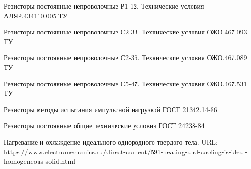 \documentclass[a4paper]{article}
\begin{document}
\begin{thebibliography}{2}
    Резисторы постоянные непроволочные Р1-12. Технические условия АЛЯР.434110.005 ТУ

    Резисторы постоянные непроволочные С2-33. Технические условия ОЖО.467.093 ТУ

    Резисторы постоянные непроволочные С2-36. Технические условия ОЖО.467.089 ТУ

    Резисторы постоянные непроволочные С5-47. Технические условия ОЖО.467.531 ТУ

    Резисторы методы испытания импульсной нагрузкой ГОСТ 21342.14-86

    Резисторы постоянные общие технические условия ГОСТ 24238-84

    Нагревание и охлаждение идеального однородного твердого тела.
URL: https://www.electromechanics.ru/direct-current/591-heating-and-cooling-is-ideal-homogeneous-solid.html
\end{thebibliography}
\end{document}
